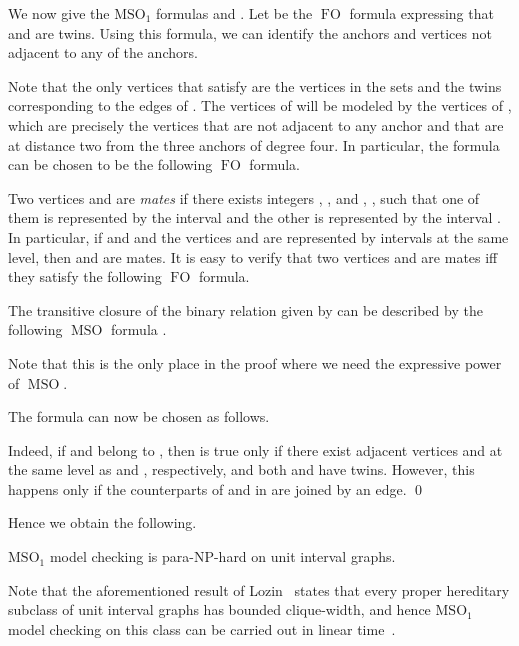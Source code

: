 \documentclass{CSML}
\newcommand{\FO}{\ensuremath{\operatorname{FO}}\xspace}
\newcommand{\MSO}{\ensuremath{\operatorname{MSO}}\xspace}
\newcommand{\MSOi}{\ensuremath{\operatorname{MSO_1}}\xspace}
\theoremstyle{plain}\newtheorem{claim}[thm]{Claim}
\begin{document}
We now give the \MSOi formulas  and .
Let  be the \FO formula expressing that  and  are twins.
Using this formula, we can identify the anchors and vertices not adjacent to any of the anchors.

Note that the only vertices  that satisfy  are 
the vertices in the sets  and the  twins corresponding to the edges of .
The vertices of  will be modeled by the vertices of ,
which are precisely the vertices that are not adjacent to any anchor and
that are at distance two from the three anchors of degree four.
In particular, the formula  can be chosen to be the following \FO formula.


Two vertices  and  are {\em mates}
if there exists integers , , and , , such that
one of them is represented by the interval  and
the other is represented by the interval .
In particular, if  and  and the vertices  and  are represented by intervals at the same level,
then  and  are mates.
It is easy to verify that two vertices  and  are mates iff they satisfy the following \FO formula.

The transitive closure of the binary relation given by  can be described
by the following \MSO formula .

Note that this is the only place in the proof where we need the expressive power of \MSO.

The formula  can now be chosen as follows.

Indeed, if  and  belong to ,
then  is true only if there exist adjacent vertices  and  at the same level as  and , respectively, and
both  and  have twins.
However, this happens only if the counterparts of  and  in  are joined by an edge.
\qed

Hence we obtain the following.
\begin{cor}
\label{cor-MSO}
\MSOi model checking is para-\textup{NP}-hard on unit interval graphs.
\end{cor}
Note that the aforementioned result of Lozin~\cite{loz08} states that
every proper hereditary subclass of unit interval graphs has bounded clique-width,
and hence \MSOi model checking on this class can be carried out in linear time~\cite{cmr00}.




\end{document}
